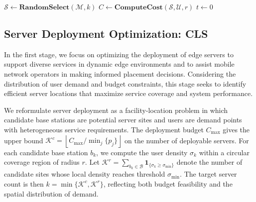 \documentclass[10pt, conference, letterpaper]{IEEEtran}
\begin{document}
\addtolength{\topmargin}{0.06in}
\begin{algorithm}[!t]
    \caption{Coverage-based Local Search (CLS)}
    \label{algo:local_search}
    $\mathcal{S} \leftarrow \textbf{RandomSelect}(\mathcal{M},k)$\;
    $C \leftarrow \textbf{ComputeCost}(\mathcal{S}, \mathcal{U}, r)$\;
    $t \leftarrow 0$\;


\end{algorithm}

\subsection{Server Deployment Optimization: CLS}
In the first stage, we focus on optimizing the deployment of edge servers to support diverse services in dynamic edge environments and to assist mobile network operators in making informed placement decisions. Considering the distribution of user demand and budget constraints, this stage seeks to identify efficient server locations that maximize service coverage and system performance. 


We reformulate server deployment as a facility-location problem in which candidate base stations are potential server sites and users are demand points with heterogeneous service requirements. The deployment budget $C_{\max}$ gives the upper bound $\mathcal{K}^c=\left\lfloor C_{\max}/\min_j\{p_j\}\right\rfloor$ on the number of deployable servers. For each candidate base station $b_k$, we compute the user density $\sigma_k$ within a circular coverage region of radius $r$. Let $\mathcal{K}^r=\sum_{b_k\in\mathcal{B}}\mathbf{1}_{\{\sigma_k\geq\sigma_{\min}\}}$ denote the number of candidate sites whose local density reaches threshold $\sigma_{\min}$. The target server count is then $k=\min\{\mathcal{K}^c,\mathcal{K}^r\}$, reflecting both budget feasibility and the spatial distribution of demand.
\end{document}
